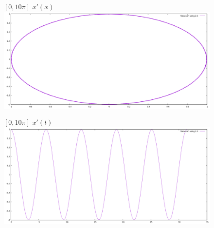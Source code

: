 \documentclass[12pt, a4paper] {report}
\theoremstyle{remark}
\theoremstyle{definition}
\begin{document}
\newpage
\begin{figure}[h!]
$[0, 10\pi]$ $x'(x)$ \\
\centering
\includegraphics[width=1\linewidth]{010pi23.png} 
\end{figure}
\begin{figure}[h!]
$[0, 10\pi]$ $x'(t)$ \\
\centering
\includegraphics[width=1\linewidth]{010pi13.png} 
\end{figure}
\newpage
\\
\end{document}
